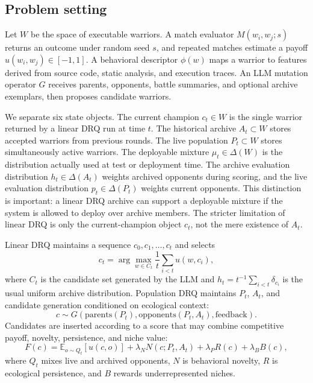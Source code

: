 \documentclass[11pt]{article}
\begin{document}
\subsection{Problem setting}

Let $W$ be the space of executable warriors. A match evaluator $M(w_i,w_j;s)$ returns an outcome under random seed $s$, and repeated matches estimate a payoff $u(w_i,w_j)\in[-1,1]$. A behavioral descriptor $\phi(w)$ maps a warrior to features derived from source code, static analysis, and execution traces. An LLM mutation operator $G$ receives parents, opponents, battle summaries, and optional archive exemplars, then proposes candidate warriors.

We separate six state objects. The current champion $c_t\in W$ is the single warrior returned by a linear DRQ run at time $t$. The historical archive $A_t\subset W$ stores accepted warriors from previous rounds. The live population $P_t\subset W$ stores simultaneously active warriors. The deployable mixture $\mu_t\in\Delta(W)$ is the distribution actually used at test or deployment time. The archive evaluation distribution $h_t\in\Delta(A_t)$ weights archived opponents during scoring, and the live evaluation distribution $p_t\in\Delta(P_t)$ weights current opponents. This distinction is important: a linear DRQ archive can support a deployable mixture if the system is allowed to deploy over archive members. The stricter limitation of linear DRQ is only the current-champion object $c_t$, not the mere existence of $A_t$.

Linear DRQ maintains a sequence $c_0,c_1,\ldots,c_t$ and selects
\[
c_t = \arg\max_{w\in C_t} \frac{1}{t}\sum_{i<t} u(w,c_i),
\]
where $C_t$ is the candidate set generated by the LLM and $h_t=t^{-1}\sum_{i<t}\delta_{c_i}$ is the usual uniform archive distribution. Population DRQ maintains $P_t$, $A_t$, and candidate generation conditioned on ecological context:
\[
c \sim G(\mathrm{parents}(P_t),\mathrm{opponents}(P_t,A_t),\mathrm{feedback}).
\]
Candidates are inserted according to a score that may combine competitive payoff, novelty, persistence, and niche value:
\[
F(c)=
\mathbb{E}_{o\sim Q_t}[u(c,o)]
+ \lambda_N N(c;P_t,A_t)
+ \lambda_P R(c)
+ \lambda_B B(c),
\]
where $Q_t$ mixes live and archived opponents, $N$ is behavioral novelty, $R$ is ecological persistence, and $B$ rewards underrepresented niches.
\end{document}
